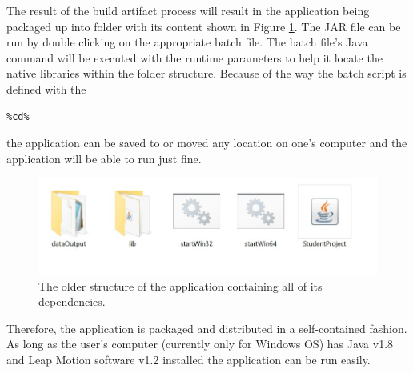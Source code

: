 The result of the build artifact process will result in the application being packaged up into folder with its content shown in Figure \ref{fig:jarFolderStructure}. The JAR file can be run by double clicking on the appropriate batch file. The batch file's Java command will be executed with the runtime parameters to help it locate the native libraries within the folder structure. Because of the way the batch script is defined with the \begin{verbatim}
%cd%
\end{verbatim} 
the application can be saved to or moved any location on one's computer and the application will be able to run just fine. 
\begin{figure}[H]
\centering
\includegraphics[scale=0.45]{Figures/6_folderStructure.JPG}
\caption[JAR Application Folder Structure]{The older structure of the application containing all of its dependencies.}
\label{fig:jarFolderStructure}
\end{figure}
Therefore, the application is packaged and distributed in a self-contained fashion. As long as the user's computer (currently only for Windows OS) has Java v1.8 and Leap Motion software v1.2 installed the application can be run easily. 